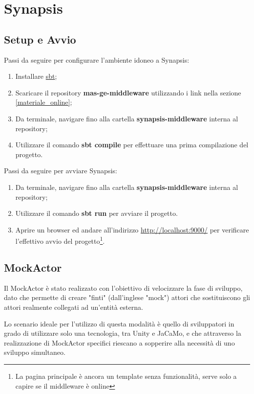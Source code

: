 \chapter{Synapsis}

\section{Setup e Avvio}

Passi da seguire per configurare l'ambiente idoneo a Synapsis:
\begin{enumerate}
    \item Installare \href{https://www.scala-sbt.org/}{sbt};
    \item Scaricare il repository \textbf{mas-ge-middleware} utilizzando i link nella sezione \ref{materiale_online};
    \item Da terminale, navigare fino alla cartella \textbf{synapsis-middleware} interna al repository;
    \item Utilizzare il comando \textbf{sbt compile} per effettuare una prima compilazione del progetto.
\end{enumerate}

Passi da seguire per avviare Synapsis:
\begin{enumerate}
    \item Da terminale, navigare fino alla cartella \textbf{synapsis-middleware} interna al repository;
    \item Utilizzare il comando \textbf{sbt run} per avviare il progetto.
    \item Aprire un browser ed andare all'indirizzo \href{http://localhost:9000/}{http://localhost:9000/} per verificare l'effettivo avvio del progetto\footnote{La pagina principale è ancora un template senza funzionalità, serve solo a capire se il middleware è online}.
\end{enumerate}

\section{MockActor} \label{mock_actor}
Il MockActor è stato realizzato con l'obiettivo di velocizzare la fase di sviluppo, dato che permette di creare "finti" (dall'inglese "mock") attori che sostituiscono gli attori realmente collegati ad un'entità esterna. 

\medskip

Lo scenario ideale per l'utilizzo di questa modalità è quello di sviluppatori in grado di utilizzare solo una tecnologia, tra Unity e JaCaMo, e che attraverso la realizzazione di MockActor specifici riescano a sopperire alla necessità di uno sviluppo simultaneo.

